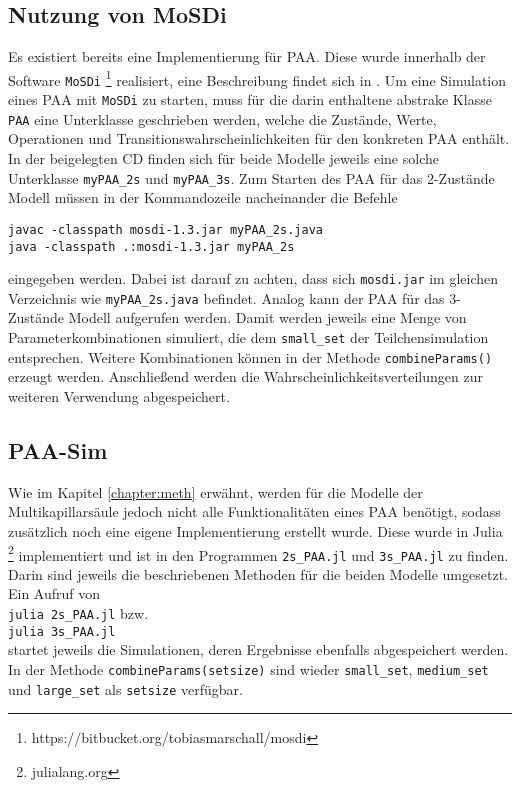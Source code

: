 \subsection{Nutzung von MoSDi}
Es existiert bereits eine Implementierung für PAA. Diese wurde innerhalb der Software \texttt{MoSDi} \footnote{https://bitbucket.org/tobiasmarschall/mosdi} realisiert, eine Beschreibung findet sich in \cite{Marschall2011}. Um eine Simulation eines PAA mit \texttt{MoSDi} zu starten, muss für die darin enthaltene abstrake Klasse \texttt{PAA} eine Unterklasse geschrieben werden, welche die Zustände, Werte, Operationen und Transitionswahrscheinlichkeiten für den konkreten PAA enthält. In der beigelegten CD finden sich für beide Modelle jeweils eine solche Unterklasse \texttt{myPAA\_2s} und \texttt{myPAA\_3s}. 
Zum Starten des PAA für das 2-Zustände Modell müssen in der Kommandozeile nacheinander die Befehle
\begin{verbatim}
javac -classpath mosdi-1.3.jar myPAA_2s.java
java -classpath .:mosdi-1.3.jar myPAA_2s 
\end{verbatim}
eingegeben werden. Dabei ist darauf zu achten, dass sich \texttt{mosdi.jar} im gleichen Verzeichnis wie \texttt{myPAA\_2s.java} befindet. Analog kann der PAA für das 3-Zustände Modell aufgerufen werden. Damit werden jeweils eine Menge von Parameterkombinationen simuliert, die dem \verb!small_set! der Teilchensimulation entsprechen. Weitere Kombinationen können in der Methode \verb!combineParams()! erzeugt werden. Anschließend werden die Wahrscheinlichkeitsverteilungen zur weiteren Verwendung abgespeichert.

\subsection{PAA-Sim}
Wie im Kapitel \ref{chapter:meth} erwähnt, werden für die Modelle der Multikapillarsäule jedoch nicht alle Funktionalitäten eines PAA benötigt, sodass zusätzlich noch eine eigene Implementierung erstellt wurde. Diese wurde in Julia \footnote{julialang.org} implementiert und ist in den Programmen \verb!2s_PAA.jl! und \verb!3s_PAA.jl! zu finden. Darin sind jeweils die beschriebenen Methoden für die beiden Modelle umgesetzt.
Ein Aufruf von \\
\verb!julia 2s_PAA.jl! bzw. \\ \verb!julia 3s_PAA.jl! \\startet jeweils die Simulationen, deren Ergebnisse ebenfalls abgespeichert werden. In der Methode \verb!combineParams(setsize)! sind wieder \texttt{small\_set}, \texttt{medium\_set} und \texttt{large\_set} als \texttt{setsize} verfügbar.


